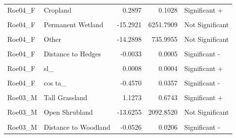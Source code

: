 \documentclass[10pt,a4paper]{article}
\begin{document}
\begin{longtable}[t]{llrrl}
\addlinespace
Roe04\_F & Cropland & 0.2897 & 0.1028 & Significant +\\
\cellcolor{gray!10}{Roe04\_F} & \cellcolor{gray!10}{Tall Grassland} & \cellcolor{gray!10}{0.0710} & \cellcolor{gray!10}{0.1139} & \cellcolor{gray!10}{Not Significant}\\
Roe04\_F & Permanent Wetland & -15.2921 & 6251.7909 & Not Significant\\
\cellcolor{gray!10}{Roe04\_F} & \cellcolor{gray!10}{Human Settlements} & \cellcolor{gray!10}{-15.3252} & \cellcolor{gray!10}{4474.9879} & \cellcolor{gray!10}{Not Significant}\\
Roe04\_F & Other & -14.2898 & 735.9955 & Not Significant\\
\addlinespace
\cellcolor{gray!10}{Roe04\_F} & \cellcolor{gray!10}{Distance to Woodland} & \cellcolor{gray!10}{-0.0016} & \cellcolor{gray!10}{0.0007} & \cellcolor{gray!10}{Significant -}\\
Roe04\_F & Distance to Hedges & -0.0033 & 0.0005 & Significant -\\
\cellcolor{gray!10}{Roe04\_F} & \cellcolor{gray!10}{Road Crossing} & \cellcolor{gray!10}{0.0519} & \cellcolor{gray!10}{0.0708} & \cellcolor{gray!10}{Not Significant}\\
Roe04\_F & sl\_ & 0.0008 & 0.0004 & Significant +\\
\cellcolor{gray!10}{Roe04\_F} & \cellcolor{gray!10}{log sl\_} & \cellcolor{gray!10}{-0.0323} & \cellcolor{gray!10}{0.0441} & \cellcolor{gray!10}{Not Significant}\\
\addlinespace
Roe04\_F & cos ta\_ & -0.4570 & 0.0357 & Significant -\\
\cellcolor{gray!10}{Roe03\_M} & \cellcolor{gray!10}{Evergreen Needleleaf Forest} & \cellcolor{gray!10}{0.3222} & \cellcolor{gray!10}{0.1669} & \cellcolor{gray!10}{Significant +}\\
Roe03\_M & Tall Grassland & 1.1273 & 0.6743 & Significant +\\
\cellcolor{gray!10}{Roe03\_M} & \cellcolor{gray!10}{Short Grassland} & \cellcolor{gray!10}{-9.6499} & \cellcolor{gray!10}{12303.5977} & \cellcolor{gray!10}{Not Significant}\\
Roe03\_M & Open Shrubland & -13.6255 & 2092.8520 & Not Significant\\
\addlinespace
\cellcolor{gray!10}{Roe03\_M} & \cellcolor{gray!10}{Human Settlements} & \cellcolor{gray!10}{-13.6620} & \cellcolor{gray!10}{2704.2926} & \cellcolor{gray!10}{Not Significant}\\
Roe03\_M & Distance to Woodland & -0.0526 & 0.0206 & Significant -\\

\end{longtable}
\end{document}
